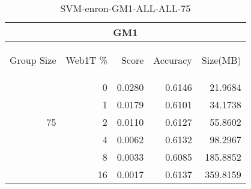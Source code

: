 \begin{center}
\begin{table}[htbp] 
 \begin{center}
\begin{tabular}{ | r | r | r | r | r |}
\hline
\multicolumn{5}{|c|}{GM1}\\
\hline
\begin{sideways}Group Size\end{sideways} & \begin{sideways}Web1T \%\end{sideways} & \begin{sideways}Score\end{sideways} & \begin{sideways}Accuracy\end{sideways} & \begin{sideways}Size(MB)\end{sideways}\\
\hline
\multirow{5}{*}{75}
 & 0 & 0.0280 & 0.6146 & 21.9684\\ \cline{2-5}
 & 1 & 0.0179 & 0.6101 & 34.1738\\ \cline{2-5}
 & 2 & 0.0110 & 0.6127 & 55.8602\\ \cline{2-5}
 & 4 & 0.0062 & 0.6132 & 98.2967\\ \cline{2-5}
 & 8 & 0.0033 & 0.6085 & 185.8852\\ \cline{2-5}
 & 16 & 0.0017 & 0.6137 & 359.8159\\ \cline{2-5}
\hline
\end{tabular}
\caption{SVM-enron-GM1-ALL-ALL-75}
\label{table:SVM-enron-GM1-ALL-ALL-75}
\end{center}
 \end{table}
\end{center}

